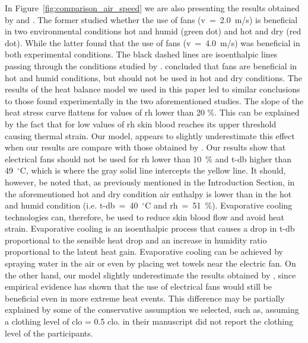 In Figure~\ref{fig:comparison_air_speed} we are also presenting the results obtained by  and .
The former studied whether the use of fans (\ac{v}~=~2.0~m/s) is beneficial in two environmental conditions hot and humid (green dot) and hot and dry (red dot).
While the latter found that the use of fans (\ac{v}~=~4.0~m/s) was beneficial in both experimental conditions.
The black dashed lines are isoenthalpic lines passing through the conditions studied by .
 concluded that fans are beneficial in hot and humid conditions, but should not be used in hot and dry conditions.
The results of the heat balance model we used in this paper led to similar conclusions to those found experimentally in the two aforementioned studies.
The slope of the heat stress curve flattens for values of \ac{rh} lower than 20 \%.
This can be explained by the fact that for low values of \ac{rh} skin blood reaches its upper threshold causing thermal strain.
Our model, appears to slightly underestimate this effect when our results are compare with those obtained by .
Our results show that electrical fans should not be used for \ac{rh} lower than 10~\% and \ac{t-db} higher than 49~$^{\circ}$C\@, which is where the gray solid line intercepts the yellow line.
It should, however, be noted that, as previously mentioned in the Introduction Section, in the aforementioned hot and dry condition air enthalpy is lower than in the hot and humid condition (i.e. \ac{t-db}~=~40~$^{\circ}$C and \ac{rh}~=~51~\%).
Evaporative cooling technologies can, therefore, be used to reduce skin blood flow and avoid heat strain.
Evaporative cooling is an isoenthalpic process that causes a drop in \ac{t-db} proportional to the sensible heat drop and an increase in humidity ratio proportional to the latent heat gain.
Evaporative cooling can be achieved by spraying water in the air or even by placing wet towels near the electric fan.
On the other hand, our model slightly underestimate the results obtained by , since empirical evidence has shown that the use of electrical fans would still be beneficial even in more extreme heat events.
This difference may be partially explained by some of the conservative assumption we selected, such as, assuming a clothing level of \ac{clo} = 0.5 clo.
 in their manuscript did not report the clothing level of the participants.

